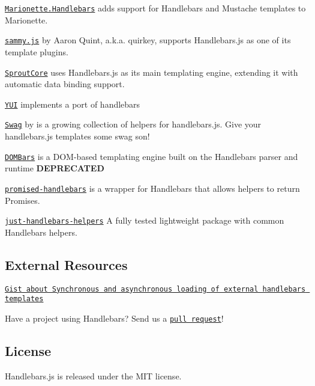 \begin{DoxyItemize}
\item \href{https://github.com/hashchange/marionette.handlebars}{\tt Marionette.\+Handlebars} adds support for Handlebars and Mustache templates to Marionette.
\item \href{http://github.com/quirkey/sammy}{\tt sammy.\+js} by Aaron Quint, a.\+k.\+a. quirkey, supports Handlebars.\+js as one of its template plugins.
\item \href{http://www.sproutcore.com}{\tt Sprout\+Core} uses Handlebars.\+js as its main templating engine, extending it with automatic data binding support.
\item \href{http://yuilibrary.com/yui/docs/handlebars/}{\tt Y\+UI} implements a port of handlebars
\item \href{https://github.com/elving/swag}{\tt Swag} by \href{https://github.com/elving}{\tt } is a growing collection of helpers for handlebars.\+js. Give your handlebars.\+js templates some swag son!
\item \href{https://github.com/blakeembrey/dombars}{\tt D\+O\+M\+Bars} is a D\+O\+M-\/based templating engine built on the Handlebars parser and runtime {\bfseries D\+E\+P\+R\+E\+C\+A\+T\+ED}
\item \href{https://github.com/nknapp/promised-handlebars}{\tt promised-\/handlebars} is a wrapper for Handlebars that allows helpers to return Promises.
\item \href{https://github.com/leapfrogtechnology/just-handlebars-helpers}{\tt just-\/handlebars-\/helpers} A fully tested lightweight package with common Handlebars helpers.
\end{DoxyItemize}

\subsection*{External Resources }


\begin{DoxyItemize}
\item \href{https://gist.github.com/2287070}{\tt Gist about Synchronous and asynchronous loading of external handlebars templates}
\end{DoxyItemize}

Have a project using Handlebars? Send us a \href{https://github.com/wycats/handlebars.js/pull/new/master}{\tt pull request}!

\subsection*{License }

Handlebars.\+js is released under the M\+IT license. 